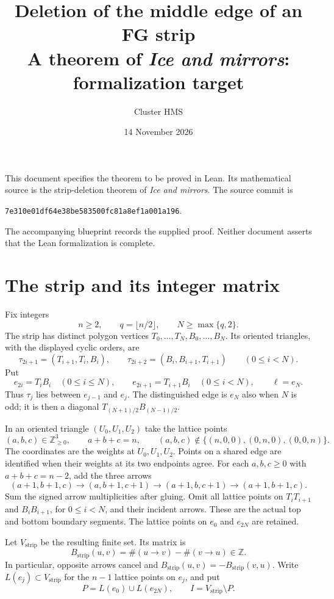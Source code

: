 \documentclass[11pt,a4paper]{article}
\title{Deletion of the middle edge of an FG strip\\\large A theorem of \emph{Ice and mirrors}: formalization target}
\author{Cluster HMS}
\date{14 November 2026}
\newcommand{\Z}{\mathbb Z}
\newcommand{\strip}{\mathrm{strip}}
\begin{document}
\maketitle
\vspace{-1.5em}
This document specifies the theorem to be proved in Lean. Its mathematical source is
the strip-deletion theorem of \emph{Ice and mirrors}.
The source commit is
\begin{center}\texttt{7e310e01df64e38be583500fc81a8ef1a001a196}.\end{center}
The accompanying blueprint records the supplied proof. Neither document asserts that
the Lean formalization is complete.

\section{The strip and its integer matrix}
Fix integers
\[
 n\ge2,\qquad q=\lfloor n/2\rfloor,\qquad N\ge\max\{q,2\}.
\]
The strip has distinct polygon vertices $T_0,\ldots,T_N,B_0,\ldots,B_N$.
Its oriented triangles, with the displayed cyclic orders, are
\[
 \tau_{2i+1}=(T_{i+1},T_i,B_i),\qquad
 \tau_{2i+2}=(B_i,B_{i+1},T_{i+1})\qquad(0\le i<N).
\]
Put
\[
 e_{2i}=T_iB_i\quad(0\le i\le N),\qquad
 e_{2i+1}=T_{i+1}B_i\quad(0\le i<N),\qquad \ell=e_N.
\]
Thus $\tau_j$ lies between $e_{j-1}$ and $e_j$. The distinguished edge is
$e_N$ also when $N$ is odd; it is then a diagonal $T_{(N+1)/2}B_{(N-1)/2}$.

In an oriented triangle $(U_0,U_1,U_2)$ take the lattice points
\[
 (a,b,c)\in\Z_{\ge0}^3,\qquad a+b+c=n,
 \qquad (a,b,c)\notin\{(n,0,0),(0,n,0),(0,0,n)\}.
\]
The coordinates are the weights at $U_0,U_1,U_2$. Points on a shared edge
are identified when their weights at its two endpoints agree. For each
$a,b,c\ge0$ with $a+b+c=n-2$, add the three arrows
\begin{equation}\label{eq:cycle}
 (a+1,b+1,c)\longrightarrow(a,b+1,c+1)
 \longrightarrow(a+1,b,c+1)\longrightarrow(a+1,b+1,c).
\end{equation}
Sum the signed arrow multiplicities after gluing. Omit all lattice points
on $T_iT_{i+1}$ and $B_iB_{i+1}$, for $0\le i<N$, and their incident arrows.
These are the actual top and bottom boundary segments. The lattice points
on $e_0$ and $e_{2N}$ are retained.

Let $V_{\strip}$ be the resulting finite set. Its matrix is
\[
 B_{\strip}(u,v)=\#(u\longrightarrow v)-\#(v\longrightarrow u)\in\Z.
\]
In particular, opposite arrows cancel and $B_{\strip}(u,v)=-B_{\strip}(v,u)$.
Write $L(e_j)\subset V_{\strip}$ for the $n-1$ lattice points on $e_j$, and put
\[
 P=L(e_0)\cup L(e_{2N}),\qquad I=V_{\strip}\setminus P.
\]
\end{document}
